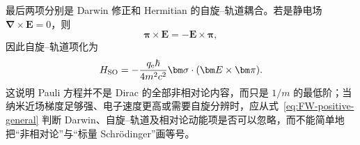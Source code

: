 最后两项分别是 Darwin 修正和 Hermitian 的自旋--轨道耦合。若是静电场 $\bm\nabla\times\bm E=0$，则
\begin{equation}
\bm\pi\times\bm E=-\bm E\times\bm\pi,
\end{equation}
因此自旋--轨道项化为
\begin{equation}
H_{\rm SO}
=-\frac{q_{\rm e}\hbar}{4m^2c^2}
\bm\sigma\cdot(\bm E\times\bm\pi).
\end{equation}
这说明 Pauli 方程并不是 Dirac 的全部非相对论内容，而只是 $1/m$ 的最低阶；当纳米近场梯度足够强、电子速度更高或需要自旋分辨时，应从式~\eqref{eq:FW-positive-general} 判断 Darwin、自旋--轨道及相对论动能项是否可以忽略，而不能简单地把“非相对论”与“标量 Schr\"odinger”画等号。


